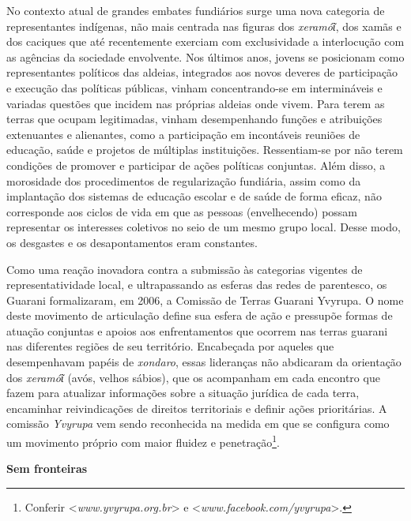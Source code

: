 No contexto atual de grandes embates fundiários surge uma nova categoria
de representantes indígenas, não mais centrada nas figuras dos
\emph{xeramóῖ}, dos xamãs e dos caciques que até recentemente exerciam
com exclusividade a interlocução com as agências da sociedade
envolvente. Nos últimos anos, jovens se posicionam como representantes
políticos das aldeias, integrados aos novos deveres de participação e
execução das políticas públicas, vinham concentrando-se em intermináveis
e variadas questões que incidem nas próprias aldeias onde vivem. Para
terem as terras que ocupam legitimadas, vinham desempenhando funções e
atribuições extenuantes e alienantes, como a participação em incontáveis
reuniões de educação, saúde e projetos de múltiplas instituições.
Ressentiam-se por não terem condições de promover e participar de ações
políticas conjuntas. Além disso, a morosidade dos procedimentos de
regularização fundiária, assim como da implantação dos sistemas de
educação escolar e de saúde de forma eficaz, não corresponde aos ciclos
de vida em que as pessoas (envelhecendo) possam representar os
interesses coletivos no seio de um mesmo grupo local. Desse modo, os
desgastes e os desapontamentos eram constantes.

Como uma reação inovadora contra a submissão às categorias vigentes de
representatividade local, e ultrapassando as esferas das redes de
parentesco, os Guarani formalizaram, em 2006, a Comissão de Terras
Guarani Yvyrupa. O nome deste movimento de articulação define sua esfera
de ação e pressupõe formas de atuação conjuntas e apoios aos
enfrentamentos que ocorrem nas terras guarani nas diferentes regiões de
seu território. Encabeçada por aqueles que desempenhavam papéis de
\emph{xondaro}, essas lideranças não abdicaram da orientação dos
\emph{xeramóῖ} (avós, velhos sábios), que os acompanham em cada encontro
que fazem para atualizar informações sobre a situação jurídica de cada
terra, encaminhar reivindicações de direitos territoriais e definir
ações prioritárias. A comissão \emph{Yvyrupa} vem sendo reconhecida na
medida em que se configura como um movimento próprio com maior fluidez e
penetração\footnote{Conferir
  \textless{}\emph{www.yvyrupa.org.br}\textgreater{} e
  \textless{}\emph{www.facebook.com/yvyrupa}\textgreater{}.}.

\textbf{Sem fronteiras}

